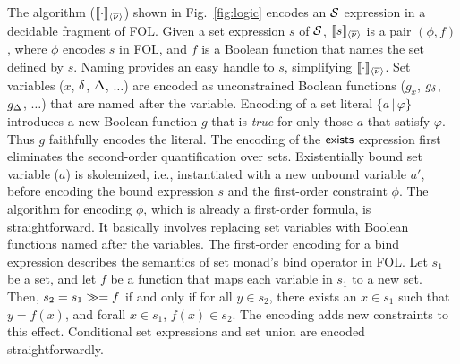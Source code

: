 The algorithm ($\llbracket \cdot \rrbracket_{\langle \overline{\nu} \rangle}$) shown in Fig.~\ref{fig:logic}
encodes an $\mathcal{S}$ expression in a decidable fragment of FOL. Given a
set expression $s$ of $\mathcal{S}$, $\llbracket s \rrbracket_{\langle \overline{\nu} \rangle}$ is a pair $(\phi,f)$, where
$\phi$ encodes $s$ in FOL, and $f$ is a Boolean function that names
the set defined by $s$.  Naming provides an easy handle to $s$,
simplifying $\llbracket \cdot \rrbracket_{\langle \overline{\nu} \rangle}$.  Set variables ($x$, $\delta$, $\Delta$,
$\dots$) are encoded as unconstrained Boolean functions ($g_x$,
$g_{\delta}$, $g_{\Delta}$, $\ldots$) that are named after the variable.
Encoding of a set literal $\{a\,|\,\varphi\}$ introduces a new Boolean
function $g$ that is \emph{true} for only those $a$ that satisfy $\varphi$.
Thus $g$ faithfully encodes the literal. The encoding of the
${\sf exists}{}$ expression first eliminates the second-order
quantification over sets.  Existentially bound set variable ($a$) is
skolemized, i.e., instantiated with a new unbound variable $a'$,
before encoding the bound expression $s$ and the first-order
constraint $\phi$. The algorithm for encoding $\phi$, which is already
a first-order formula, is straightforward. It basically involves
replacing set variables with Boolean functions named after the
variables. The first-order encoding for a bind expression describes
the semantics of set monad's bind operator in FOL. Let $s_1$ be a set, and
let $f$ be a function that maps each variable in $s_1$ to a new
set. Then, $s_2 = s_1 \gg= f$ if and only if for all $y\in s_2$,
there exists an $x \in s_1$ such that $y = f(x)$, and forall $x\in
s_1$, $f(x)\in s_2$. The encoding adds new constraints to this
effect. Conditional set expressions and set union are encoded
straightforwardly.

